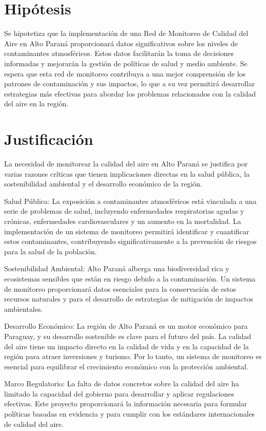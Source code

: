 \section{Hipótesis}

Se hipotetiza que la implementación de una Red de Monitoreo de Calidad del Aire en Alto Paraná proporcionará datos significativos sobre los niveles de contaminantes atmosféricos. Estos datos facilitarán la toma de decisiones informadas y mejorarán la gestión de políticas de salud y medio ambiente. Se espera que esta red de monitoreo contribuya a una mejor comprensión de los patrones de contaminación y sus impactos, lo que a su vez permitirá desarrollar estrategias más efectivas para abordar los problemas relacionados con la calidad del aire en la región.


\section{Justificación}

La necesidad de monitorear la calidad del aire en Alto Paraná se justifica por varias razones críticas que tienen implicaciones directas en la salud pública, la sostenibilidad ambiental y el desarrollo económico de la región.

Salud Pública: La exposición a contaminantes atmosféricos está vinculada a una serie de problemas de salud, incluyendo enfermedades respiratorias agudas y crónicas, enfermedades cardiovasculares y un aumento en la mortalidad. La implementación de un sistema de monitoreo permitirá identificar y cuantificar estos contaminantes, contribuyendo significativamente a la prevención de riesgos para la salud de la población.

Sostenibilidad Ambiental: Alto Paraná alberga una biodiversidad rica y ecosistemas sensibles que están en riesgo debido a la contaminación. Un sistema de monitoreo proporcionará datos esenciales para la conservación de estos recursos naturales y para el desarrollo de estrategias de mitigación de impactos ambientales.

Desarrollo Económico: La región de Alto Paraná es un motor económico para Paraguay, y su desarrollo sostenible es clave para el futuro del país. La calidad del aire tiene un impacto directo en la calidad de vida y en la capacidad de la región para atraer inversiones y turismo. Por lo tanto, un sistema de monitoreo es esencial para equilibrar el crecimiento económico con la protección ambiental.

Marco Regulatorio: La falta de datos concretos sobre la calidad del aire ha limitado la capacidad del gobierno para desarrollar y aplicar regulaciones efectivas. Este proyecto proporcionará la información necesaria para formular políticas basadas en evidencia y para cumplir con los estándares internacionales de calidad del aire.

